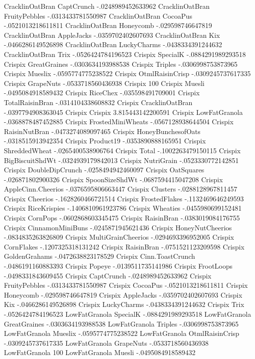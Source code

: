 CracklinOatBran	CaptCrunch	-.0248989452633962
CracklinOatBran	FruityPebbles	-.0313433781550987
CracklinOatBran	CocoaPus	-.0521013218611811
CracklinOatBran	Honeycomb	-.029598746647819
CracklinOatBran	AppleJacks	-.0359702402607693
CracklinOatBran	Kix	-.0466286149526898
CracklinOatBran	LuckyCharms	-.0438334391244632
CracklinOatBran	Trix	-.0526424784196523
Crispix	SpecialK	-.0884291989293518
Crispix	GreatGraines	-.0303634193988538
Crispix	Triples	-.0306998753873965
Crispix	Mueslix	-.0595774775238522
Crispix	OtmlRaisinCrisp	-.0309245737617335
Crispix	GrapeNuts	-.0533718560436938
Crispix	100%
Crispix	Muesli	-.0495084918589432
Crispix	RiceChex	-.035598491709001
Crispix	TotalRaisinBran	-.0314104338608832
Crispix	CracklinOatBran	-.0397794908363045
Crispix	Crispix	3.815443142200591
Crispix	LowFatGranola	-.0368878487452885
Crispix	FrostedMiniWheats	-.0567128938644504
Crispix	RaisinNutBran	-.0473274089097465
Crispix	HoneyBunchesofOats	-.0318515913942354
Crispix	Product19	-.0353890888165951
Crispix	ShreddedWheat	-.0265400538906764
Crispix	Total	-.1002263479150115
Crispix	BigBiscuitShdWt	-.0324939179842013
Crispix	NutriGrain	-.0523330772142851
Crispix	DoubleDipCrunch	-.0258494942460097
Crispix	OatSquares	-.026871802900326
Crispix	SpoonSizeShdWt	-.0687594415047208
Crispix	AppleCinn.Cheerios	-.0376595806663447
Crispix	Clusters	-.0288128967811457
Crispix	Cheerios	-.1628260466721514
Crispix	FrostedFlakes	-.1132469646249593
Crispix	RiceKrispies	-.1406810961923786
Crispix	Wheaties	-.0455980699152481
Crispix	CornPops	-.0602868603345475
Crispix	RaisinBran	-.0383019084176755
Crispix	CinnamonMiniBuns	-.0245871945621436
Crispix	HoneyNutCheerios	-.0834835263826809
Crispix	MultiGrainCheerios	-.0294693396952005
Crispix	CornFlakes	-.1207325318131242
Crispix	RaisinBran	-.0751521123209598
Crispix	GoldenGrahams	-.0472638823178529
Crispix	Cinn.ToastCrunch	-.0486191160883393
Crispix	Popeye	-.0139511735141986
Crispix	FrootLoops	-.0498331843609455
Crispix	CaptCrunch	-.0248989452633962
Crispix	FruityPebbles	-.0313433781550987
Crispix	CocoaPus	-.0521013218611811
Crispix	Honeycomb	-.029598746647819
Crispix	AppleJacks	-.0359702402607693
Crispix	Kix	-.0466286149526898
Crispix	LuckyCharms	-.0438334391244632
Crispix	Trix	-.0526424784196523
LowFatGranola	SpecialK	-.0884291989293518
LowFatGranola	GreatGraines	-.0303634193988538
LowFatGranola	Triples	-.0306998753873965
LowFatGranola	Mueslix	-.0595774775238522
LowFatGranola	OtmlRaisinCrisp	-.0309245737617335
LowFatGranola	GrapeNuts	-.0533718560436938
LowFatGranola	100%
LowFatGranola	Muesli	-.0495084918589432

